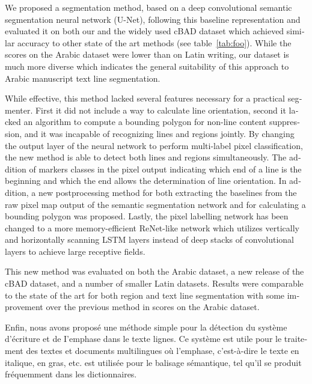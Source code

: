 \begin{french}
We proposed a segmentation method, based on a deep convolutional semantic
segmentation neural network (U-Net), following this baseline representation and
evaluated it on both our and the widely used cBAD dataset which achieved
similar accuracy to other state of the art methods (see table~\ref{tab:foo}).
While the scores on the Arabic dataset were lower than on Latin writing, our
dataset is much more diverse which indicates the general suitability of this
approach to Arabic manuscript text line segmentation.

While effective, this method lacked several features necessary for a practical
segmenter. First it did not include a way to calculate line orientation, second
it lacked an algorithm to compute a bounding polygon for non-line content
suppression, and it was incapable of recognizing lines and regions jointly. By
changing the output layer of the neural network to perform multi-label pixel
classification, the new method is able to detect both lines and regions
simultaneously. The addition of markers classes in the pixel output indicating
which end of a line is the beginning and which the end allows the determination
of line orientation. In addition, a new postprocessing method for both
extracting the baselines from the raw pixel map output of the semantic
segmentation network and for calculating a bounding polygon was proposed.
Lastly, the pixel labelling network has been changed to a more memory-efficient
ReNet-like network which utilizes vertically and horizontally scanning LSTM
layers instead of deep stacks of convolutional layers to achieve large
receptive fields.

This new method was evaluated on both the Arabic dataset, a new release of the
cBAD dataset, and a number of smaller Latin datasets. Results were comparable
to the state of the art for both region and text line segmentation with some
improvement over the previous method in scores on the Arabic dataset.

Enfin, nous avons proposé une méthode simple pour la détection du système
d'écriture et de I'emphase dans le texte lignes. Ce système est utile pour le
traitement des textes et documents multilingues où l'emphase, c'est-à-dire le
texte en italique, en gras, etc. est utilisée pour le balisage sémantique, tel
qu'il se produit fréquemment dans les dictionnaires.


\end{french}
